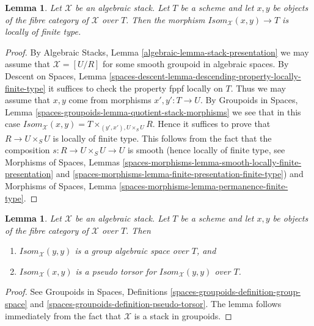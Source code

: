 \documentclass{stacks-project}
\theoremstyle{plain}
\newtheorem{lemma}[subsection]{Lemma}
\theoremstyle{definition}
\theoremstyle{remark}
\numberwithin{equation}{subsection}
\begin{document}
\begin{lemma}
\label{lemma-isom-locally-finite-type}
Let $\mathcal{X}$ be an algebraic stack.
Let $T$ be a scheme and let $x, y$ be objects of the fibre category of
$\mathcal{X}$ over $T$. Then the morphism
$\mathit{Isom}_\mathcal{X}(x, y) \to T$ is locally of finite type.
\end{lemma}

\begin{proof}
By
Algebraic Stacks, Lemma \ref{algebraic-lemma-stack-presentation}
we may assume that $\mathcal{X} = [U/R]$ for some smooth
groupoid in algebraic spaces.
By
Descent on Spaces,
Lemma \ref{spaces-descent-lemma-descending-property-locally-finite-type}
it suffices to check the property fppf locally on $T$.
Thus we may assume that $x, y$ come from morphisms
$x', y' : T \to U$. By
Groupoids in Spaces,
Lemma \ref{spaces-groupoids-lemma-quotient-stack-morphisms}
we see that in this case
$\mathit{Isom}_\mathcal{X}(x, y) = T \times_{(y', x'), U \times_S U} R$.
Hence it suffices to prove that $R \to U \times_S U$ is
locally of finite type. This follows from the fact that the composition
$s : R \to U \times_S U \to U$ is smooth (hence locally of finite type, see
Morphisms of Spaces, Lemmas
\ref{spaces-morphisms-lemma-smooth-locally-finite-presentation} and
\ref{spaces-morphisms-lemma-finite-presentation-finite-type})
and
Morphisms of Spaces, Lemma \ref{spaces-morphisms-lemma-permanence-finite-type}.
\end{proof}

\begin{lemma}
\label{lemma-isom-pseudo-torsor-aut}
Let $\mathcal{X}$ be an algebraic stack.
Let $T$ be a scheme and let $x, y$ be objects of the fibre category of
$\mathcal{X}$ over $T$. Then
\begin{enumerate}
\item $\mathit{Isom}_\mathcal{X}(y, y)$ is a group algebraic space
over $T$, and
\item $\mathit{Isom}_\mathcal{X}(x, y)$ is a pseudo torsor for
$\mathit{Isom}_\mathcal{X}(y, y)$ over $T$.
\end{enumerate}
\end{lemma}

\begin{proof}
See
Groupoids in Spaces,
Definitions \ref{spaces-groupoids-definition-group-space} and
\ref{spaces-groupoids-definition-pseudo-torsor}.
The lemma follows immediately from the fact that $\mathcal{X}$ is a
stack in groupoids.
\end{proof}
\end{document}
